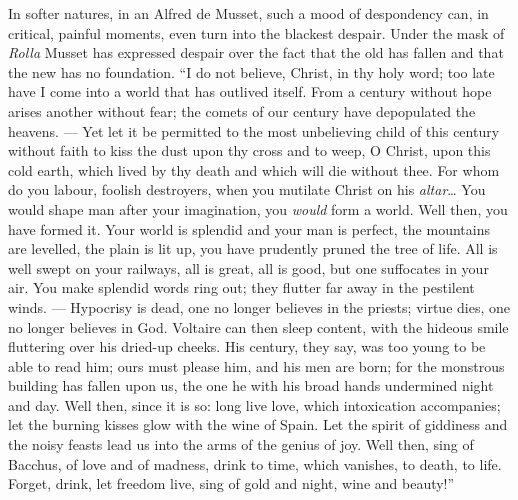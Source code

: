 \documentclass[12pt,a4paper,openany]{book}
\newcommand{\opage}[1]{\marginnote{\footnotesize\textit{[#1]}}}
\begin{document}
In softer natures, in an Alfred de Musset,
such a mood of despondency can, in critical, painful
moments, even turn into the blackest despair.
Under the mask of \emph{Rolla} Musset has expressed despair
over the fact that the old has fallen and that the new
\setcounter{footnote}{0}%
\opage{91}has no foundation. ``I do not believe, Christ, in thy
holy word; too late have I come into a world
that has outlived itself. From a century without hope arises
another without fear; the comets of our century
have depopulated the heavens. --- Yet let it be
permitted to the most unbelieving child of this century without
faith to kiss the dust upon thy cross and to weep, O Christ,
upon this cold earth, which lived by thy death and
which will die without thee. For whom do you labour, foolish
destroyers, when you mutilate Christ on his \emph{altar}\dots{}
You would shape man after your imagination, you \emph{would}
form a world. Well then, you have formed it. Your
world is splendid and your man is perfect,
the mountains are levelled, the plain is lit up, you have prudently
pruned the tree of life. All is well swept on your railways,
all is great, all is good, but one suffocates in your
air. You make splendid words ring out; they flutter far away
in the pestilent winds. --- Hypocrisy is dead, one no longer
believes in the priests; virtue dies, one no longer believes
in God. Voltaire can then sleep content, with the hideous
smile fluttering over his dried-up cheeks. His
century, they say, was too young to be able to read
him; ours must please him, and his men are born;
for the monstrous building has fallen upon us, the one he with
his broad hands undermined night and day. Well then,
since it is so: long live love, which intoxication
accompanies; let the burning kisses glow with the
wine of Spain. Let the spirit of giddiness and the noisy
feasts lead us into the arms of the genius of joy. Well then,
sing of Bacchus, of love and of madness, drink
to time, which vanishes, to death, to life. Forget,
\setcounter{footnote}{0}%
\opage{92}drink, let freedom live, sing of gold and night,
wine and beauty!''
\end{document}
